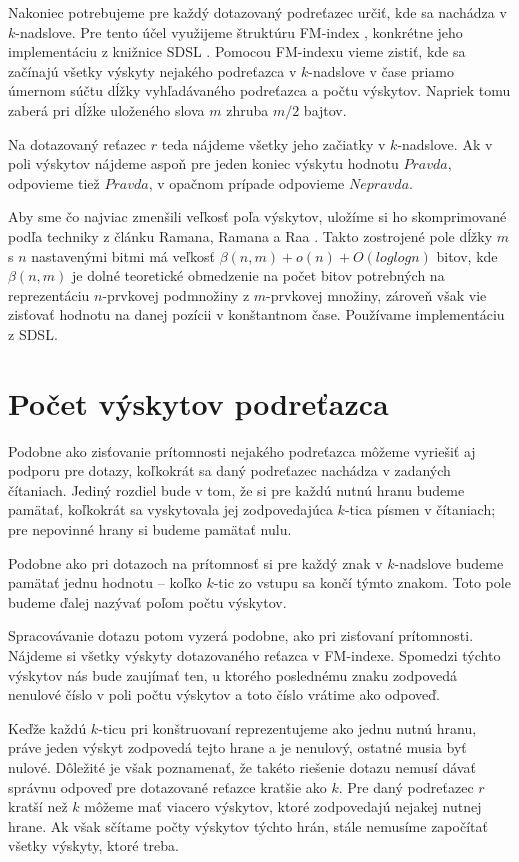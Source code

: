 Nakoniec potrebujeme pre každý dotazovaný podreťazec určiť, kde sa nachádza v $k$-nadslove.
Pre tento účel využijeme štruktúru FM-index \cite{fm_index}, konkrétne jeho implementáciu
z knižnice SDSL \cite{sdsl}. Pomocou FM-indexu vieme zistiť, kde sa začínajú všetky
výskyty nejakého podreťazca v $k$-nadslove v čase priamo úmernom súčtu dĺžky vyhľadávaného podreťazca
a počtu výskytov. Napriek tomu zaberá pri dĺžke uloženého slova $m$ zhruba $m/2$
bajtov.

Na dotazovaný reťazec $r$ teda nájdeme všetky jeho začiatky v $k$-nadslove. Ak
v poli výskytov nájdeme aspoň pre jeden koniec výskytu hodnotu $Pravda$, odpovieme
tiež $Pravda$, v opačnom prípade odpovieme $Nepravda$.

Aby sme čo najviac zmenšili veľkosť poľa výskytov, uložíme si ho skomprimované
podľa techniky z článku Ramana, Ramana a Raa \cite{rrr_vector}. Takto zostrojené pole
dĺžky $m$ s $n$ nastavenými bitmi má veľkosť $\beta(n, m) + o(n) + O(log log n)$ bitov,
kde $\beta(n, m)$ je dolné teoretické obmedzenie na počet bitov potrebných na reprezentáciu
$n$-prvkovej podmnožiny z $m$-prvkovej množiny, zároveň však vie zisťovať hodnotu na danej
pozícii v konštantnom čase. Používame implementáciu z SDSL.

\section{Počet výskytov podreťazca}

Podobne ako zisťovanie prítomnosti nejakého podreťazca môžeme vyriešiť aj podporu
pre dotazy, koľkokrát sa daný podreťazec nachádza v zadaných čítaniach. Jediný rozdiel
bude v tom, že si pre každú nutnú hranu budeme pamätať, koľkokrát sa vyskytovala jej
zodpovedajúca $k$-tica písmen v čítaniach; pre nepovinné hrany si budeme pamätať nulu.

Podobne ako pri dotazoch na prítomnosť si pre každý znak v $k$-nadslove
budeme pamätať jednu hodnotu -- koľko $k$-tic zo vstupu sa končí týmto znakom. Toto
pole budeme ďalej nazývať poľom počtu výskytov.

Spracovávanie dotazu potom vyzerá podobne, ako pri zisťovaní prítomnosti. Nájdeme
si všetky výskyty dotazovaného reťazca v FM-indexe. Spomedzi týchto výskytov nás
bude zaujímať ten, u ktorého poslednému znaku zodpovedá nenulové číslo
v poli počtu výskytov a toto číslo vrátime ako odpoveď. 

Keďže každú $k$-ticu pri konštruovaní
reprezentujeme ako jednu nutnú hranu, práve jeden výskyt zodpovedá tejto hrane a
je nenulový, ostatné musia byť nulové. Dôležité je však poznamenať, že takéto
riešenie dotazu nemusí dávať správnu odpoveď pre dotazované reťazce kratšie ako $k$.
Pre daný podreťazec $r$ kratší než $k$ môžeme mať viacero výskytov, ktoré zodpovedajú
nejakej nutnej hrane. Ak však sčítame počty výskytov týchto hrán, stále nemusíme
započítať všetky výskyty, ktoré treba.

